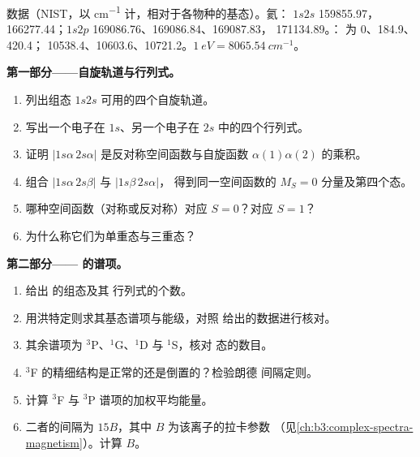 \begin{problem}
\label{pb:b3:many-electron-atoms:1}
数据（NIST，以 \unit{cm^{-1}} 计，相对于各物种的基态）。氦：
$1s2s$  159855.97， 166277.44；$1s2p$
 169086.76、169086.84、169087.83，
171134.89。： 为 0、184.9、420.4；
10538.4、10603.6、10721.2。$\qty{1}{eV} = \qty{8065.54}{cm^{-1}}$。

\medskip\noindent\textbf{第一部分——自旋轨道与行列式。}
\begin{enumerate}
  \item 列出组态 $1s2s$ 可用的四个自旋轨道。
  \item 写出一个电子在 $1s$、另一个电子在
        $2s$ 中的四个行列式。
  \item 证明 $|1s\alpha\,2s\alpha|$ 是反对称空间函数与自旋函数
        $\alpha(1)\alpha(2)$ 的乘积。
  \item 组合 $|1s\alpha\,2s\beta|$ 与 $|1s\beta\,2s\alpha|$，
        得到同一空间函数的 $M_S = 0$ 分量及第四个态。
  \item 哪种空间函数（对称或反对称）对应
        $S = 0$？对应 $S = 1$？
  \item 为什么称它们为单重态与三重态？
\end{enumerate}

\medskip\noindent\textbf{第二部分—— 的谱项。}
\begin{enumerate}[resume]
  \item 给出  的组态及其
        行列式的个数。
  \item 用洪特定则求其基态谱项与能级，对照
        给出的数据进行核对。
  \item 其余谱项为 ${}^3$P、${}^1$G、${}^1$D 与 ${}^1$S，核对
        态的数目。
  \item ${}^3$F 的精细结构是正常的还是倒置的？检验朗德
        间隔定则。
  \item 计算 ${}^3$F 与 ${}^3$P 谱项的加权平均能量。
  \item 二者的间隔为 $15B$，其中 $B$ 为该离子的拉卡参数
        （见\cref{ch:b3:complex-spectra-magnetism}）。计算 $B$。
\end{enumerate}


\end{problem}

